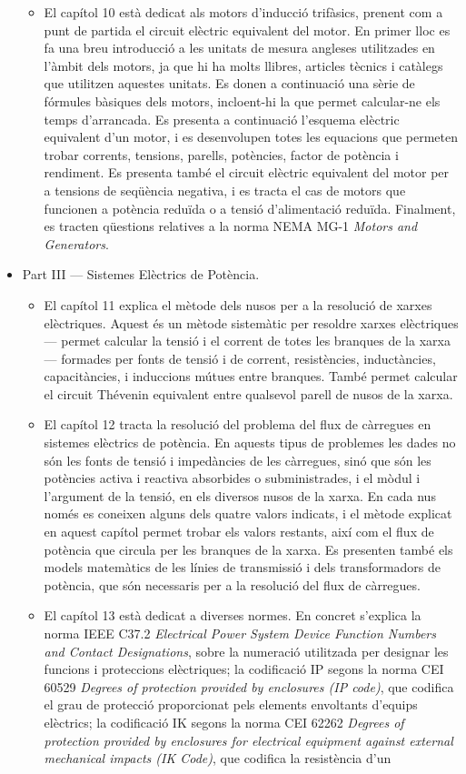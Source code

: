 \begin{itemize}
\begin{itemize}
			\item El capítol 10 està dedicat als motors d'inducció trifàsics, prenent com a punt de partida el circuit elèctric equivalent del motor. En primer lloc es fa una breu introducció  a les unitats de mesura angleses utilitzades en l'àmbit dels motors, ja que hi ha molts llibres, articles tècnics i catàlegs que utilitzen aquestes unitats. Es donen a continuació una sèrie de fórmules bàsiques dels motors, incloent-hi la que permet calcular-ne els temps d'arrancada. Es presenta a continuació l'esquema elèctric equivalent d'un motor, i es desenvolupen totes les equacions que permeten trobar   corrents, tensions, parells, potències, factor de potència i rendiment. Es presenta també el circuit elèctric equivalent del motor per a tensions 
			de seqüència negativa, i es tracta el cas de motors que funcionen a potència reduïda o a tensió d'alimentació reduïda. Finalment,  es tracten qüestions relatives a la norma NEMA MG-1 \textit{Motors and Generators}. 
		\end{itemize}
		\item Part III --- Sistemes Elèctrics de Potència. 
		\begin{itemize}
			\item El capítol 11 explica el mètode dels nusos per a la resolució de xarxes elèctriques. Aquest és un mètode sistemàtic per resoldre xarxes elèctriques --- permet calcular la tensió i el corrent de totes les branques de la xarxa --- formades per fonts de tensió i de corrent, resistències, inductàncies, capacitàncies, i induccions mútues entre branques. També permet calcular el circuit Thévenin equivalent entre qualsevol parell de nusos de la xarxa.
			\item El capítol 12 tracta la resolució del problema del flux de càrregues en sistemes 	elèctrics de potència. En aquests tipus de problemes les dades no són les fonts de tensió i impedàncies de les càrregues, sinó que són les potències activa i reactiva absorbides o subministrades, i el mòdul i l'argument de la tensió, en els diversos nusos de la xarxa. En cada nus només es coneixen alguns dels quatre valors indicats, i el mètode explicat en aquest capítol permet trobar els valors restants, així com el flux de potència que circula per les branques de la xarxa. Es presenten també els models matemàtics de les línies de transmissió i dels transformadors de potència, que són necessaris per a la resolució del flux de càrregues.
			\item El capítol 13 està dedicat a  diverses normes. En concret s'explica la norma IEEE C37.2 \textit{Electrical Power System Device Function Numbers and Contact Designations}, sobre la numeració utilitzada per designar les funcions i proteccions elèctriques; la codificació IP segons la norma CEI 60529 \textit{Degrees of protection provided by enclosures (IP code)}, que codifica el grau de protecció proporcionat pels 			elements envoltants d’equips elèctrics; la codificació IK segons  la norma CEI 62262 \textit{Degrees of protection provided by enclosures for 			electrical equipment against external mechanical impacts (IK Code)}, que  codifica la resistència d’un

\end{itemize}
\end{itemize}
